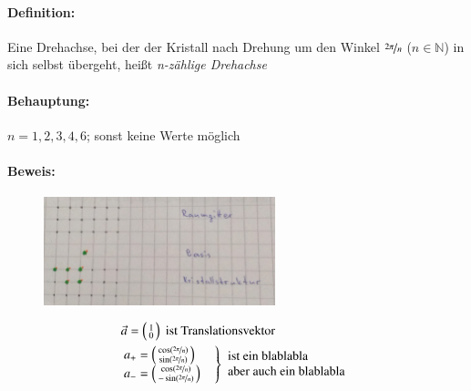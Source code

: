 \documentclass[paper=A4,12pt,pagesize,twoside,BCOR=8mm,ngerman]{scrartcl}
\newenvironment{rcases}{%
  \left.\renewcommand*\lbrace.%
  \begin{cases}}%
{\end{cases}\right\rbrace}
\begin{document}
			\paragraph*{Definition:} Eine Drehachse, bei der der Kristall nach 
			Drehung um den Winkel $\nicefrac{2\pi}{n}$ 
			($n \in \mathbb{N}$) in sich selbst übergeht, heißt 
			\emph{n-zählige Drehachse}\\
			\paragraph*{Behauptung:} $n=1, 2, 3, 4, 6$; sonst keine Werte 
			möglich\\
			\paragraph*{Beweis:} 
			\begin{figure}[H]
					\centering
					\includegraphics[width=0.6\textwidth]
					{pics/pic003.jpg}
			\end{figure}
			\begin{align*}
				&\vec{a}=\left( \begin{smallmatrix} 1 \\ 0 
				\end{smallmatrix}
				\right)	\;\text{ist Translationsvektor}\\
				&\begin{rcases}
					a_+ = \left( \begin{smallmatrix} \cos 
					(\nicefrac{2\pi}{n}) \\ \sin (\nicefrac{2\pi}{n}) 
					\end{smallmatrix} \right)\\
					a_- = \left( \begin{smallmatrix} \cos 
					(\nicefrac{2\pi}{n}) \\ -\sin (\nicefrac{2\pi}{n}) 
					\end{smallmatrix} \right)\\
				\end{rcases}
				\begin{array}{l}
					\text{ist ein blablabla}\\
					\text{aber auch ein blablabla}
				\end{array}
			\end{align*}
\end{document}

